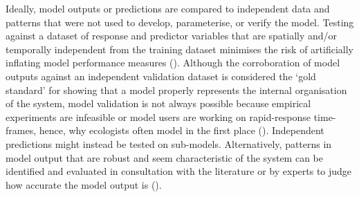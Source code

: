 \documentclass[
]{article}
\begin{document}
\begin{tcolorbox}[enhanced jigsaw, opacitybacktitle=0.6, bottomrule=.15mm, leftrule=.75mm, rightrule=.15mm, colbacktitle=quarto-callout-note-color!10!white, toprule=.15mm, titlerule=0mm, left=2mm, colframe=quarto-callout-note-color-frame, breakable, title=\textcolor{quarto-callout-note-color}{\faInfo}\hspace{0.5em}{Explanation}, opacityback=0, coltitle=black, bottomtitle=1mm, colback=white, toptitle=1mm, arc=.35mm]

Ideally, model outputs or predictions are compared to independent data
and patterns that were not used to develop, parameterise, or verify the
model. Testing against a dataset of response and predictor variables
that are spatially and/or temporally independent from the training
dataset minimises the risk of artificially inflating model performance
measures (). Although the
corroboration of model outputs against an independent validation dataset
is considered the `gold standard' for showing that a model properly
represents the internal organisation of the system, model validation is
not always possible because empirical experiments are infeasible or
model users are working on rapid-response time-frames, hence, why
ecologists often model in the first place
(). Independent
predictions might instead be tested on sub-models. Alternatively,
patterns in model output that are robust and seem characteristic of the
system can be identified and evaluated in consultation with the
literature or by experts to judge how accurate the model output is
().

\end{tcolorbox}
\end{document}
